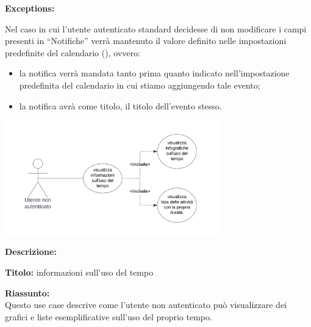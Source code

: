\begin{listaPersonale}[UC]{}
    \textbf{Exceptions:}
    \begin{enumerate}[label=\textbf{[exception \arabic{enumii}]}, ref= \textbf{[exception \arabic{enumii}]}]
         Nel caso in cui l'utente autenticato standard decidesse di non modificare i campi presenti in “Notifiche” verrà mantenuto il valore definito nelle impostazioni predefinite del calendario (), ovvero:
        \begin{itemize}
            \item la notifica verrà mandata tanto prima quanto indicato nell'impostazione predefinita del calendario in cui stiamo aggiungendo tale evento;
            \item la notifica avrà come titolo, il titolo dell'evento stesso.
        \end{itemize}
    \end{enumerate}






    



    \newpage


    \begin{center}
        \includegraphics[width=0.7\textwidth]{img/Diagrammi/UseCases/UsoDelTempo.png}
    \end{center}

    \textbf{Descrizione:}

    \textbf{Titolo:} informazioni sull'uso del tempo

    \textbf{Riassunto:} \\
    Questo use case descrive come l'utente non autenticato può visualizzare dei grafici e liste esemplificative sull'uso del proprio tempo.


\end{listaPersonale}
